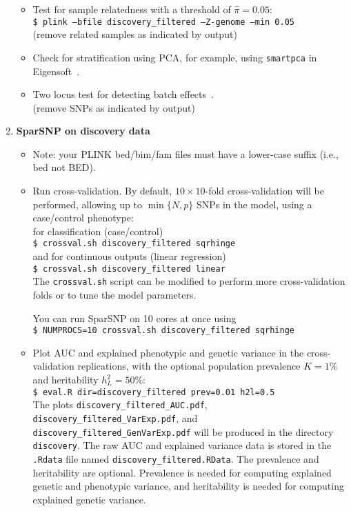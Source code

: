 \documentclass[a4paper,11pt]{article}
\begin{document}
\begin{enumerate}
\begin{itemize}
      \item Test for sample relatedness with a threshold of $\hat{\pi}=0.05$: \\
      \texttt{\$ plink --bfile discovery\_filtered --Z-genome --min 0.05} \\
      (remove related samples as indicated by output)

      \item Check for stratification using PCA, for example, using
      \texttt{smartpca} in Eigensoft~\citep{price2006}.

      \item Two locus test for detecting batch effects~\citep{lee2010b}. \\
      (remove SNPs as indicated by output)

      \end{itemize}

   \item \textbf{SparSNP on discovery data}


      \begin{itemize}

	 \item Note: your PLINK bed/bim/fam files must have a lower-case suffix
	 (i.e., bed not BED).

	 \item Run cross-validation. By default, $10\times10$-fold
	 cross-validation will be performed, allowing up to $\min \{N, p\}$ SNPs
	 in the model, using a case/control phenotype: \\ for classification
	 (case/control)\\ \texttt{\$ crossval.sh discovery\_filtered sqrhinge}\\
	 and for continuous outputs (linear regression)\\ \texttt{\$ crossval.sh
	 discovery\_filtered linear}\\ The \texttt{crossval.sh} script can be
	 modified to perform more cross-validation folds or to tune the model
	 parameters.

	 You can run SparSNP on 10 cores at once using\\
	 \texttt{\$ NUMPROCS=10 crossval.sh discovery\_filtered sqrhinge}

	 \item Plot AUC and explained phenotypic and genetic variance in the
	 cross-validation replications, with the optional
	 population prevalence $K=1\%$ and heritability $h^2_L=50\%$:\\
	 \texttt{\$ eval.R dir=discovery\_filtered prev=0.01 h2l=0.5} \\
	 The plots \texttt{discovery\_filtered\_AUC.pdf},
	 \texttt{discovery\_filtered\_VarExp.pdf}, and
	 \texttt{discovery\_filtered\_GenVarExp.pdf}
	 will be produced in the
	 directory \texttt{discovery}.
	 The raw AUC and explained variance data is stored in the
	 \texttt{.Rdata} file named \texttt{discovery\_filtered.RData}.
	 The prevalence and heritability are optional. Prevalence is needed
	 for computing explained genetic and phenotypic variance, and heritability is
	 needed for computing explained genetic variance.


\end{itemize}
\end{enumerate}
\end{document}
